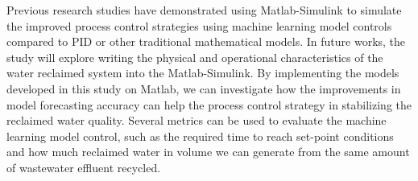 Previous research studies have demonstrated using Matlab-Simulink to simulate the improved process control strategies using machine learning model controls compared to PID or other traditional mathematical models. In future works, the study will explore writing the physical and operational characteristics of the water reclaimed system into the Matlab-Simulink. By implementing the models developed in this study on Matlab, we can investigate how the improvements in model forecasting accuracy can help the process control strategy in stabilizing the reclaimed water quality. Several metrics can be used to evaluate the machine learning model control, such as the required time to reach set-point conditions and how much reclaimed water in volume we can generate from the same amount of wastewater effluent recycled.
